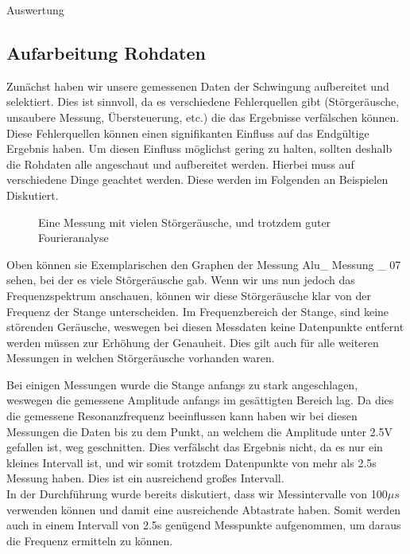 \documentclass[twoside]{protokoll}
\begin{document}
\begin{aufgabe}{Auswertung}

\subsection{Aufarbeitung Rohdaten}

    
    Zunächst haben wir unsere gemessenen Daten der Schwingung aufbereitet und selektiert.
    Dies ist sinnvoll, da es verschiedene Fehlerquellen gibt (Störgeräusche, unsaubere Messung, Übersteuerung, etc.) die das Ergebnisse verfälschen können.
    Diese Fehlerquellen können einen signifikanten Einfluss auf das Endgültige Ergebnis haben.
    Um diesen Einfluss möglichst gering zu halten, sollten deshalb die Rohdaten alle angeschaut und aufbereitet werden.
    Hierbei muss auf verschiedene Dinge geachtet werden.
    Diese werden im Folgenden an Beispielen Diskutiert. 

\begin{figure}[H]
    \caption{Eine Messung mit vielen Störgeräusche, und trotzdem guter Fourieranalyse}
  \centering
\end{figure}
 
Oben können sie Exemplarischen den Graphen der Messung Alu\_ Messung \_ 07 sehen, bei der es viele Störgeräusche gab.
Wenn wir uns nun jedoch das Frequenzspektrum anschauen, können wir diese Störgeräusche klar von der Frequenz der Stange unterscheiden.
Im Frequenzbereich der Stange, sind keine störenden Geräusche, weswegen bei diesen Messdaten keine Datenpunkte entfernt werden müssen zur Erhöhung der Genauheit.
Dies gilt auch für alle weiteren Messungen in welchen Störgeräusche vorhanden waren. 

Bei einigen Messungen wurde die Stange anfangs zu stark angeschlagen, weswegen die gemessene Amplitude anfangs im gesättigten Bereich lag.
Da dies die gemessene Resonanzfrequenz beeinflussen kann  haben wir bei diesen Messungen die Daten bis zu dem Punkt, an welchem die Amplitude unter 2.5V gefallen ist, weg geschnitten.
Dies verfälscht das Ergebnis nicht, da es nur ein kleines Intervall ist, und wir somit trotzdem Datenpunkte von mehr als 2.5s Messung haben.
Dies ist ein ausreichend großes Intervall.\\
In der Durchführung wurde bereits diskutiert, dass wir Messintervalle von 100$\mu s$ verwenden können und damit eine ausreichende Abtastrate haben.
Somit werden auch in einem Intervall von 2.5s  genügend Messpunkte aufgenommen, um daraus die Frequenz ermitteln zu können.


\end{aufgabe}
\end{document}

